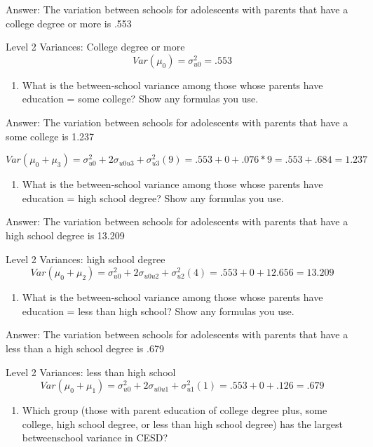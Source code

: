 \documentclass[]{article}
\providecommand{\tightlist}{%
  \setlength{\itemsep}{0pt}\setlength{\parskip}{0pt}}
\begin{document}
Answer: The variation between schools for adolescents with parents that
have a college degree or more is .553

Level 2 Variances: College degree or more
\[  Var(\mu_0) = \sigma^2_{u0} = .553  \]

\begin{enumerate}
\def\labelenumi{\alph{enumi}.}
\setcounter{enumi}{1}
\tightlist
\item
  What is the between-school variance among those whose parents have
  education = some college? Show any formulas you use.
\end{enumerate}

Answer: The variation between schools for adolescents with parents that
have a some college is 1.237

\[  Var(\mu_0 + \mu_3) = \sigma^2_{u0} + 2\sigma_{u0u3} + \sigma^2_{u3}(9) = .553 + 0 + .076*9 = .553 + .684 = 1.237  \]

\begin{enumerate}
\def\labelenumi{\alph{enumi}.}
\setcounter{enumi}{2}
\tightlist
\item
  What is the between-school variance among those whose parents have
  education = high school degree? Show any formulas you use.
\end{enumerate}

Answer: The variation between schools for adolescents with parents that
have a high school degree is 13.209

Level 2 Variances: high school degree
\[  Var(\mu_0 + \mu_2) = \sigma^2_{u0} + 2\sigma_{u0u2} + \sigma^2_{u2}(4) = .553 + 0 + 12.656 = 13.209 \]

\begin{enumerate}
\def\labelenumi{\alph{enumi}.}
\setcounter{enumi}{3}
\tightlist
\item
  What is the between-school variance among those whose parents have
  education = less than high school? Show any formulas you use.
\end{enumerate}

Answer: The variation between schools for adolescents with parents that
have a less than a high school degree is .679

Level 2 Variances: less than high school
\[  Var(\mu_0 + \mu_1) = \sigma^2_{u0} + 2\sigma_{u0u1} + \sigma^2_{u1}(1) = .553 + 0 + .126 = .679 \]

\begin{enumerate}
\def\labelenumi{\alph{enumi}.}
\setcounter{enumi}{4}
\tightlist
\item
  Which group (those with parent education of college degree plus, some
  college, high school degree, or less than high school degree) has the
  largest betweenschool variance in CESD?
\end{enumerate}
\end{document}
